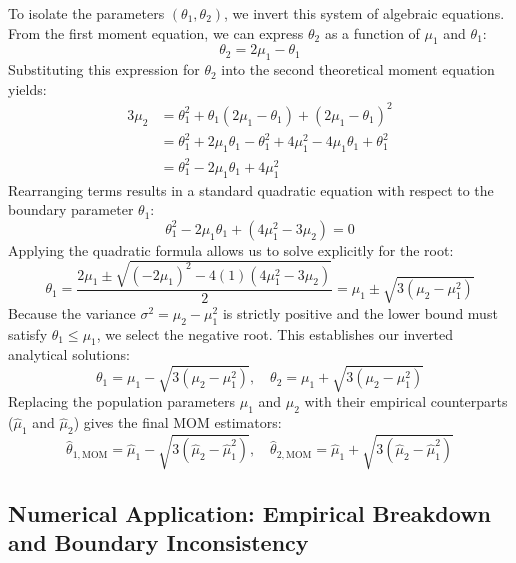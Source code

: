\documentclass{article}
\begin{document}
To isolate the parameters $(\theta_1, \theta_2)$, we invert this system of algebraic equations. From the first moment equation, we can express $\theta_2$ as a function of $\mu_1$ and $\theta_1$:
\begin{equation}
\theta_2 = 2\mu_1 - \theta_1
\end{equation}
Substituting this expression for $\theta_2$ into the second theoretical moment equation yields:
\begin{align*}
3\mu_2 &= \theta_1^2 + \theta_1(2\mu_1 - \theta_1) + (2\mu_1 - \theta_1)^2 \\
&= \theta_1^2 + 2\mu_1\theta_1 - \theta_1^2 + 4\mu_1^2 - 4\mu_1\theta_1 + \theta_1^2 \\
&= \theta_1^2 - 2\mu_1\theta_1 + 4\mu_1^2
\end{align*}
Rearranging terms results in a standard quadratic equation with respect to the boundary parameter $\theta_1$:
\begin{equation}
\theta_1^2 - 2\mu_1\theta_1 + (4\mu_1^2 - 3\mu_2) = 0
\end{equation}
Applying the quadratic formula allows us to solve explicitly for the root:
\begin{equation}
\theta_1 = \frac{2\mu_1 \pm \sqrt{(-2\mu_1)^2 - 4(1)(4\mu_1^2 - 3\mu_2)}}{2} = \mu_1 \pm \sqrt{3(\mu_2 - \mu_1^2)}
\end{equation}
Because the variance $\sigma^2 = \mu_2 - \mu_1^2$ is strictly positive and the lower bound must satisfy $\theta_1 \le \mu_1$, we select the negative root. This establishes our inverted analytical solutions:
\begin{equation}
\theta_1 = \mu_1 - \sqrt{3(\mu_2 - \mu_1^2)}, \quad \theta_2 = \mu_1 + \sqrt{3(\mu_2 - \mu_1^2)}
\end{equation}
Replacing the population parameters $\mu_1$ and $\mu_2$ with their empirical counterparts ($\hat{\mu}_1$ and $\hat{\mu}_2$) gives the final $\text{MOM}$ estimators:
\begin{equation}
\hat{\theta}_{1,\text{MOM}} = \hat{\mu}_1 - \sqrt{3\left(\hat{\mu}_2 - \hat{\mu}_1^2\right)}, \quad \hat{\theta}_{2,\text{MOM}} = \hat{\mu}_1 + \sqrt{3\left(\hat{\mu}_2 - \hat{\mu}_1^2\right)}
\end{equation}

\subsection{Numerical Application: Empirical Breakdown and Boundary Inconsistency}
\end{document}
